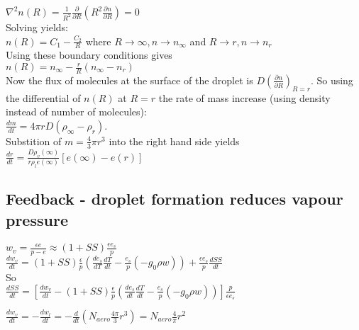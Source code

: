 \documentclass[11pt]{article} %
\begin{document}
$\nabla^{2}n(R) = \frac{1}{R^{2}}\frac{\partial}{\partial R} \left( R^{2} \frac{\partial n}{\partial R} \right) = 0$ \\

Solving yields: \\

$n(R) = C_{1} - \frac{C_{2}}{R}$ where $R \rightarrow \infty, n \rightarrow n_{\infty}$ and $R \rightarrow r, n \rightarrow n_{r}$ \\

Using these boundary conditions gives \\

$n(R) = n_{\infty} - \frac{r}{R}(n_{\infty} - n_{r})$ \\

Now the flux of molecules at the surface of the droplet is $D \left( \frac{\partial n}{\partial R} \right)_{R = r}$. So using the differential of $n(R)$  at $R = r$ the rate of mass increase (using density instead of number of molecules):\\

 $\frac{dm}{dt} = 4 \pi r D (\rho_{\infty} - \rho_{r})$.  \\

Substition of $m = \frac{4}{3}\pi r^{3}$ into the right hand side yields \\

$\frac{dr}{dt} = \frac{D\rho_{v}(\infty)}{r\rho_{l}e(\infty)}[e(\infty) - e(r)]$ 
  
\subsection{Feedback - droplet formation reduces vapour pressure}

$w_{v} = \frac{\epsilon e}{p - e} \approx (1 + SS) \frac{\epsilon e_{s}}{p}$\\

$\frac{dw_{v}}{dt} = (1 + SS) \frac{\epsilon}{p}(\frac{de_{s}}{dT} \frac{dT}{dt}  - \frac{e_{s}}{p} (-g_{0}\rho w) ) + \frac{\epsilon e_{s}}{p} \frac{dSS}{dt}$\\

So\\

$\frac{dSS}{dt} = [\frac{dw_{v}}{dt} - (1 + SS) \frac{\epsilon}{p} (\frac{de_{s}}{dt}\frac{dT}{dt} - \frac{e_{s}}{p}(-g_{0}\rho w))]\frac{p}{\epsilon e_{s}}$

$\frac{dw_{v}}{dt} = -\frac{dw_{l}}{dt} = -\frac{d}{dt} (N_{aero} \frac{4 \pi}{3}r^{3})  = N_{aero} \frac4 \pi r^{2}$\\
\end{document}
